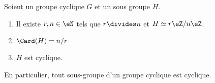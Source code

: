 \begin{lemma}     \label{LEMooZJGVooRYrujB}
    Soient un groupe cyclique \( G\) et un sous groupe \( H\).
    \begin{enumerate}
        \item       \label{ITEMooUNOEooZoElYL}
            Il existe \( r,n\in\eN\) tels que \( r\divides n\) et \( H\simeq r\eZ/n\eZ\).
        \item       \label{ITEMooMUSSooBmNXEd}
            \( \Card(H)=n/r\)
        \item       \label{ITEMooVPEKooKdPibk}
            \( H\) est cyclique.
    \end{enumerate}
    En particulier, tout sous-groupe d'un groupe cyclique est cyclique.
\end{lemma}

